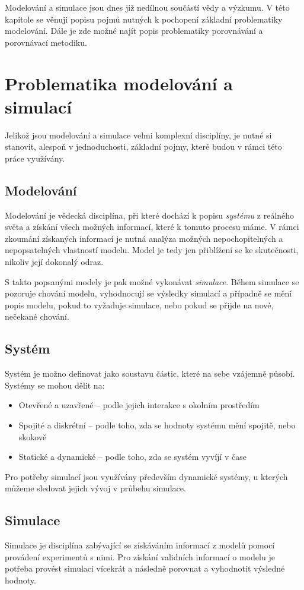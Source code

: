 Modelování a simulace jsou dnes již nedílnou součástí vědy a výzkumu. V této kapitole se věnuji popisu pojmů nutných k pochopení základní problematiky modelování. Dále je zde možné najít popis problematiky porovnávání a porovnávací metodiku.

\section{Problematika modelování a simulací}
Jelikož jsou modelování a simulace velmi komplexní disciplíny, je nutné si stanovit, alespoň v jednoduchosti, základní pojmy, které budou v rámci této práce využívány. 

\subsection{Modelování}
Modelování je vědecká disciplína, při které dochází k popisu \textit{systému} z reálného světa a získání všech možných informací, které k tomuto procesu máme. V rámci zkoumání získaných informací je nutná analýza možných nepochopitelných a nepopsatelných vlastností modelu. Model je tedy jen přiblížení se ke skutečnosti, nikoliv její dokonalý odraz. 

S takto popsanými modely je pak možné vykonávat \textit{simulace}. Během simulace se pozoruje chování modelu, vyhodnocují se výsledky simulací a případně se mění popis modelu, pokud to vyžaduje simulace, nebo pokud se přijde na nové, nečekané chování.

\subsection{Systém}
Systém je možno definovat jako soustavu částic, které na sebe vzájemně působí. Systémy se mohou dělit na:

\begin{itemize}
    \item Otevřené a uzavřené -- podle jejich interakce s okolním prostředím
    \item Spojité a diskrétní -- podle toho, zda se hodnoty systému mění spojitě, nebo skokově
    \item Statické a dynamické -- podle toho, zda se systém vyvíjí v čase
\end{itemize}
Pro potřeby simulací jsou využívány především dynamické systémy, u kterých můžeme sledovat jejich vývoj v průbehu simulace.

\subsection{Simulace}
Simulace je disciplína zabývající se získáváním informací z modelů pomocí provádení experimentů s nimi. Pro získání validních informací o modelu je potřeba provést simulaci vícekrát a následně porovnat a vyhodnotit výsledné hodnoty. 

